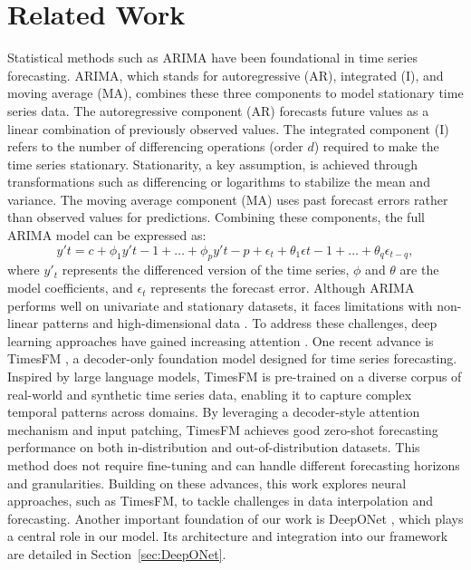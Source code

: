 \documentclass{article}
\theoremstyle{plain}
\theoremstyle{definition}
\theoremstyle{remark}
\begin{document}
\section{Related Work}
Statistical methods such as ARIMA have been foundational in time series forecasting. ARIMA, which stands for autoregressive (AR), integrated (I), and moving average (MA), combines these three components to model stationary time series data. The autoregressive component (AR) forecasts future values as a linear combination of previously observed values. The integrated component (I) refers to the number of differencing operations (order $d$) required to make the time series stationary. Stationarity, a key assumption, is achieved through transformations such as differencing or logarithms to stabilize the mean and variance. The moving average component (MA) uses past forecast errors rather than observed values for predictions. Combining these components, the full ARIMA model can be expressed as:
\begin{equation} 
y't = c + \phi_1 y'{t-1} + \dots + \phi_p y'{t-p} + \epsilon_t + \theta_1 \epsilon{t-1} + \dots + \theta_q \epsilon_{t-q},
\end{equation}
where $y'_t$ represents the differenced version of the time series, $\phi$ and $\theta$ are the model coefficients, and $\epsilon_t$ represents the forecast error.  
Although ARIMA performs well on univariate and stationary datasets, it faces limitations with non-linear patterns and high-dimensional data \cite{stellwagen2013arima}. To address these challenges, deep learning approaches have gained increasing attention \cite{stellwagen2013arima}. One recent advance is TimesFM \cite{das2024decoderonlyfoundationmodeltimeseries}, a decoder-only foundation model designed for time series forecasting. Inspired by large language models, TimesFM is pre-trained on a diverse corpus of real-world and synthetic time series data, enabling it to capture complex temporal patterns across domains. By leveraging a decoder-style attention mechanism and input patching, TimesFM achieves good zero-shot forecasting performance on both in-distribution and out-of-distribution datasets. This method does not require fine-tuning and can handle different forecasting horizons and granularities.
Building on these advances, this work explores neural approaches, such as TimesFM, to tackle challenges in data interpolation and forecasting. Another important foundation of our work is DeepONet \cite{Deeponet}, which plays a central role in our model. Its architecture and integration into our framework are detailed in Section~\ref{sec:DeepONet}.
\end{document}
